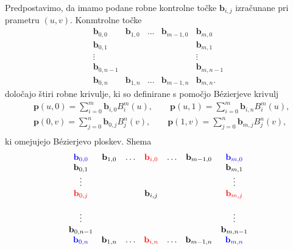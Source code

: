 \documentclass[a4paper,12pt]{article}
\begin{document}
Predpostavimo, da imamo podane robne kontrolne točke $\mathbf{b}_{i,j}$ 
izračunane pri prametru $(u,v)$. Konmtrolne točke
$$
\begin{matrix}
   \mathbf{b}_{0,0}  &\mathbf{b}_{1,0} & \ldots &\mathbf{b}_{m-1,0} &\mathbf{b}_{m,0} \\
   \mathbf{b}_{0,1}  &                 &        &                   &\mathbf{b}_{m,1} \\
   \vdots            &                 &        &                   &  \vdots\\
   \mathbf{b}_{0,n-1} &                &        &                    &\mathbf{b}_{m,n-1} \\ 
   \mathbf{b}_{0,n}  &\mathbf{b}_{1,n} & \ldots &\mathbf{b}_{m-1,n} &\mathbf{b}_{m,n}. 
\end{matrix}
$$
določajo štiri robne krivulje,  ki so definirane s pomočjo Bézierjeve krivulj
\begin{align*}
    &\mathbf{p}(u,0) =\sum_{i=0}^m \mathbf{b}_{i,0} B_i^m(u), \qquad
    \mathbf{p}(u,1) =\sum_{i=0}^m \mathbf{b}_{i,n} B_i^m(u),  \\
    &\mathbf{p}(0,v) =\sum_{j=0}^n \mathbf{b}_{0,j} B_j^n(v), \qquad
    \mathbf{p}(1,v) =\sum_{j=0}^n \mathbf{b}_{m,j} B_j^n(v),  \\
 \end{align*}
ki omejujejo Bézierjevo ploskev.
Shema  
 $$
 \begin{matrix}
     \color{blue} \mathbf{b}_{0,0}  &\mathbf{b}_{1,0} & \ldots & \color{red} \mathbf{b}_{i,0} & \ldots &\mathbf{b}_{m-1,0}  &\color{blue} \mathbf{b}_{m,0} \\
    \mathbf{b}_{0,1}  &                 &        & &      &                   &\mathbf{b}_{m,1} \\
    \vdots            &                 &        & &     &                   &  \vdots\\
    \color{red} \mathbf{b}_{0,j}                 &                 &        & \mathbf{b}_{i,j} &  &   & \color{red} \mathbf{b}_{m,j} \\                  &  \\
    \vdots            &                 &        & &    &                   & \vdots \\
    \mathbf{b}_{0,n-1} &                &         & &     &                    &\mathbf{b}_{m,n-1} \\ 
    \color{blue} \mathbf{b}_{0,n}  &\mathbf{b}_{1,n} & \ldots  & \color{red} \mathbf{b}_{i,n} & \ldots  &\mathbf{b}_{m-1,n} &\color{blue} \mathbf{b}_{m,n} 
 \end{matrix}
 $$
\end{document}
